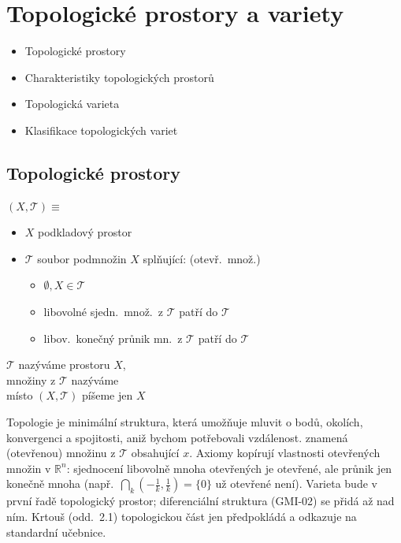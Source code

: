 \section{Topologické prostory a variety}

\begin{itemize}[nosep]
  \item Topologické prostory
  \item Charakteristiky topologických prostorů
  \item Topologická varieta
  \item Klasifikace topologických variet
\end{itemize}

\subsection{Topologické prostory}

\begin{definice}
 $(X,\mathcal{T}) \equiv$
\begin{itemize}[nosep]
  \item[] $X$ \quad podkladový prostor
  \item[] $\mathcal{T}$ \quad soubor podmnožin $X$ splňující: \hfill (otevř.\ množ.)
  \begin{itemize}[nosep]
    \item $\emptyset, X\in\mathcal{T}$
    \item libovolné sjedn.\ množ.\ z $\mathcal{T}$ patří do $\mathcal{T}$
    \item libov.\ konečný průnik mn.\ z $\mathcal{T}$ patří do $\mathcal{T}$
  \end{itemize}
\end{itemize}
$\mathcal{T}$ nazýváme  prostoru $X$, \\
množiny z $\mathcal{T}$ nazýváme  \\
místo $(X,\mathcal{T})$ píšeme jen $X$
\end{definice}

\begin{vysvetleni}
Topologie je minimální struktura, která umožňuje mluvit o  bodů, okolích, konvergenci a spojitosti, aniž bychom potřebovali vzdálenost.  znamená (otevřenou) množinu z $\mathcal{T}$ obsahující $x$. Axiomy kopírují vlastnosti otevřených množin v $\mathbb{R}^n$: sjednocení libovolně mnoha otevřených je otevřené, ale průnik jen konečně mnoha (např.\ $\bigcap_{k}(-\tfrac1k,\tfrac1k)=\{0\}$ už otevřené není). Varieta bude v první řadě topologický prostor; diferenciální struktura (GMI-02) se přidá až nad ním. Krtouš (odd.~2.1) topologickou část jen předpokládá a odkazuje na standardní učebnice.
\end{vysvetleni}

